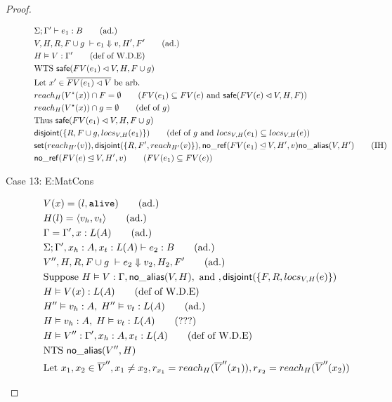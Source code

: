\documentclass[11pt]{article}
\newcommand{\ms}[1]{\ensuremath{\mathsf{#1}}}
\newcommand{\irl}[1]{\mathtt{#1}}
\newcommand{\na}[1]{\mathsf{no\_alias}(#1)}
\newcommand{\nr}[1]{\mathsf{no\_ref}(#1)}
\newcommand{\safe}[1]{\mathsf{safe}(#1)}
\newcommand{\dist}[1]{\mathsf{disjoint}(#1)}
\begin{document}
\begin{proof}
\begin{description}
\begin{align*}
  &\Sigma; \Gamma' \vdash e_1 : B \tag{ad.}\\
  &V,H,R,F \cup g \; \vdash e_1 \Downarrow v, H',F' \tag{ad.}\\
  &H \vDash V : \Gamma' \tag{def of W.D.E}\\
  &\text{WTS } \safe{FV(e_1) \lhd V,H,F \cup g}\\
  &\text{Let } x' \in \overline{FV(e_1) \lhd V} \text{ be arb.}\\
  &reach_{H}(V^{\star}(x)) \cap F = \emptyset \tag{$FV(e_1) \subseteq FV(e)$ and $\safe{FV(e) \lhd V,H,F}$}\\
  &reach_H(V^{\star}(x)) \cap g = \emptyset \tag{def of $g$}\\
  &\text{Thus } \safe{FV(e_1) \lhd V,H,F \cup g}\\
  &\dist{\{R,F \cup g,locs_{V,H}(e_1)\}} \tag{def of $g$ and $locs_{V,H}(e_1) \subseteq locs_{V,H}(e)$}\\
  &\ms{set}(reach_{H'}(v)), \dist{\{R,F',reach_{H'}(v)\}},\nr{FV(e_1) \unlhd V,H',v} \na{V,H'} \tag{IH}\\
  &\nr{FV(e) \unlhd V,H',v} \tag{$FV(e_1) \subseteq FV(e)$}\\
  \end{align*}
  \item [Case 13: E:MatCons]
  \begin{align*}
  &V(x) = (l,\irl{alive}) \tag{ad.}\\
  &H(l) = \pairexcst{v_h}{v_t} \tag{ad.}\\
  &\Gamma = \Gamma', x : L(A) \tag{ad.}\\
  &\Sigma; \Gamma', x_h : A, x_t : L(A) \vdash e_2 : B \tag{ad.}\\
  &V'',H,R,F \cup g \; \vdash e_2 \Downarrow v_2, H_2, F' \tag{ad.} \\
  &\text{Suppose } H \vDash V : \Gamma, \na{V,H}, \text{ and },\dist{\{F,R,locs_{V,H}(e)\}}\\
  &H \vDash V(x) : L(A) \tag{def of W.D.E}\\
  &H''\vDash v_h : A,\; H'' \vDash v_t : L(A) \tag{ad.}\\
  &H\vDash v_h : A,\; H \vDash v_t : L(A) \tag{???}\\
  &H \vDash V'' : \Gamma', x_h : A, x_t : L(A) \tag{def of W.D.E}\\
  &\text{NTS } \na{V'',H}\\
  &\text{Let } x_1, x_2 \in \overline V'', x_1 \ne x_2, r_{x_1} = reach_H(\overline V''(x_1)), r_{x_2} = reach_H(\overline V''(x_2))\\

\end{align*}
\end{description}
\end{proof}
\end{document}
